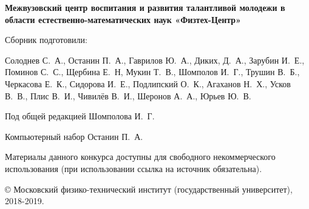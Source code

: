 \documentclass[12pt, a4paper, usenames]{article}
\begin{document}
\bigskip

\newpage

\textrm{ }

\vspace{16 cm}

\begin{center}
{\bf Межвузовский центр воспитания и развития талантливой молодежи в
области естественно-математических наук «Физтех-Центр»}
\end{center}

Сборник подготовили:

\smallskip

Солоднев С.~А., Останин П.~А., Гаврилов Ю.~А., Диких, Д.~А., Зарубин И.~Е., Поминов С.~С., Щербина Е.~Н, Мукин Т.~В., Шомполов И.~Г., Трушин В.~Б., Черкасова Е.~К., Сидорова И.~Е., Подлипский О.~К., Агаханов Н.~Х., Усков В.~В., Плис В.~И., Чивилёв В.~И., Шеронов А.~А., Юрьев Ю.~В.

\smallskip

Под общей редакцией Шомполова И.~Г.

\smallskip

Компьютерный набор Останин П.~А.

\smallskip

Материалы данного конкурса доступны для свободного некоммерческого использования (при использовании ссылка на источник обязательна).

\smallskip

\copyright\textbf{ }Московский физико-технический институт (государственный университет), 2018-2019.
\end{document}
